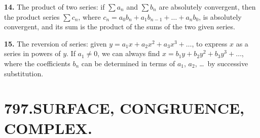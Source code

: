 \documentclass[11pt,a4paper]{book}
\begin{document}
\textbf{14.}\quad
The product of two series: if $\sum a_{n}$ and $\sum b_{n}$ are absolutely convergent, then the product series $\sum c_{n}$, where $c_{n} = a_{0}b_{n} + a_{1}b_{n-1} + \ldots + a_{n}b_{0}$, is absolutely convergent, and its sum is the product of the sums of the two given series.

\textbf{15.}\quad
The reversion of series: given $y = a_{1}x + a_{2}x^{2} + a_{3}x^{3} + \ldots$, to express $x$ as a series in powers of $y$. If $a_{1} \neq 0$, we can always find $x = b_{1}y + b_{2}y^{2} + b_{3}y^{3} + \ldots$, where the coefficients $b_{n}$ can be determined in terms of $a_{1}$, $a_{2}$, \ldots\ by successive substitution.





\section*{797.\quad SURFACE, CONGRUENCE, COMPLEX.}


\smallskip
\end{document}
